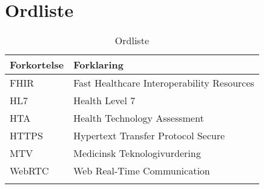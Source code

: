 \AtBeginShipoutNext{\AtBeginShipoutNext{\AtBeginShipoutDiscard}}
\chapter{Ordliste}

\begin{longtabu} to 
	\textbf{Forkortelse} & \textbf{Forklaring} \\[-1ex]
	\midrule
	FHIR & Fast Healthcare Interoperability Resources \\[-1ex]
	HL7 & Health Level 7 \\[-1ex]
	 HTA & Health Technology Assessment \\[-1ex]
	 HTTPS & Hypertext Transfer Protocol Secure \\[-1ex]
	 MTV & Medicinsk Teknologivurdering \\[-1ex]
	 
	 WebRTC & Web Real-Time Communication \\[-1ex] 



	\caption{Ordliste}
\end{longtabu}

